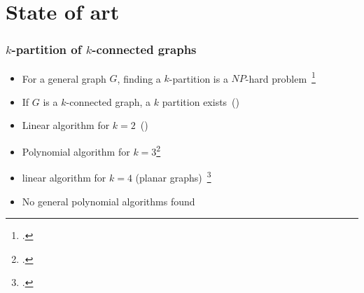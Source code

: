 \section{State of art}
%


\begin{frame}
  \frametitle{$k$-partition of $k$-connected graphs}
  \begin{itemize}
  \item For a general graph $G$, finding a $k$-partition is a $NP$-hard
    problem~\footcite{BF06}%
  \item If $G$ is a $k$-connected graph, a $k$ partition exists~(\cite{GE78,LL77})
  \item Linear algorithm for $k = 2$~(\cite{Suzuki1990227})
  \item Polynomial algorithm for $k = 3$\footcite{Wada1994}
  \item linear algorithm for $k = 4$ (planar graphs)~\footcite{Nakano1997315}
  \item No general polynomial algorithms found
  \end{itemize}
\end{frame}


